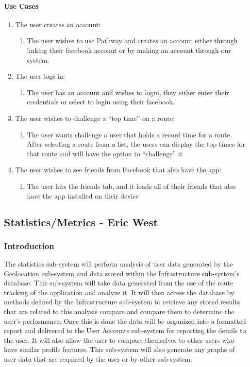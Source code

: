 \documentclass{article}
\begin{document}
\paragraph{Use Cases}
\begin{enumerate}
\item The user creates an account:
    \begin{enumerate}
    \item The user wishes to use Pathway and creates an account either through linking their facebook account or by making an account through our system.
    \end{enumerate}
\item The user logs in:
    \begin{enumerate}
    \item The user has an account and wishes to login, they either enter their credentials or select to login using their facebook.
    \end{enumerate}
\item The user wishes to challenge a “top time” on a route:
    \begin{enumerate}
    \item The user wants challenge a user that holds a record time for a route. After selecting a route from a list, the users can display the top times for that route and will have the option to “challenge” it
    \end{enumerate}
\item The user wishes to see friends from Facebook that also have the app:
    \begin{enumerate}
    \item The user hits the friends tab, and it loads all of their friends that also have the app installed on their device
    \end{enumerate}
\end{enumerate}

\newpage

\subsection{Statistics/Metrics - Eric West}
\subsubsection{Introduction}
The statistics sub-system will perform analysis of user data generated by the Geolocation sub-system and data stored within the Infrastructure sub-system's database. This sub-system will take data generated from the use of the route tracking of the application and analyze it. It will then access the database by methods defined by the Infrastructure sub-system to retrieve any stored results that are related to this analysis compare and compare them to determine the user's performance. Once this is done the data will be organized into a formatted report and delivered to the User Accounts sub-system for reporting the details to the user. It will also allow the user to compare themselves to other users who have similar profile features. This sub-system will also generate any graphs of user data that are required by the user or by other sub-system.
\end{document}
